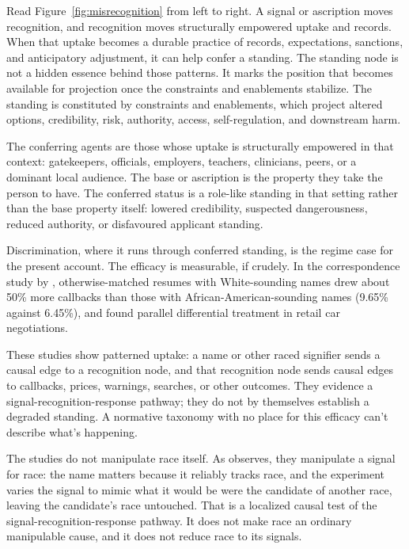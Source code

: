 \documentclass[12pt]{article}
\begin{document}
Read Figure~\ref{fig:misrecognition} from left to right. A signal or ascription moves recognition, and recognition moves structurally empowered uptake and records. When that uptake becomes a durable practice of records, expectations, sanctions, and anticipatory adjustment, it can help confer a standing. The standing node is not a hidden essence behind those patterns. It marks the position that becomes available for projection once the constraints and enablements stabilize. The standing is constituted by constraints and enablements, which project altered options, credibility, risk, authority, access, self-regulation, and downstream harm.

The conferring agents are those whose uptake is structurally empowered in that context: gatekeepers, officials, employers, teachers, clinicians, peers, or a dominant local audience. The base or ascription is the property they take the person to have. The conferred status is a role-like standing in that setting rather than the base property itself: lowered credibility, suspected dangerousness, reduced authority, or disfavoured applicant standing.

Discrimination, where it runs through conferred standing, is the regime case for the present account. The efficacy is measurable, if crudely. In the correspondence study by \textcite[997--998]{bertrandMullainathan2004EmilyGreg}, otherwise-matched resumes with White-sounding names drew about 50\% more callbacks than those with African-American-sounding names (9.65\% against 6.45\%), and \textcite{ayres1991FairDriving} found parallel differential treatment in retail car negotiations.

These studies show patterned uptake: a name or other raced signifier sends a causal edge to a recognition node, and that recognition node sends causal edges to callbacks, prices, warnings, searches, or other outcomes. They evidence a signal-recognition-response pathway; they do not by themselves establish a degraded standing. A normative taxonomy with no place for this efficacy can't describe what's happening.

The studies do not manipulate race itself. As \textcite{weinbergerSignalManipulation} observes, they manipulate a signal for race: the name matters because it reliably tracks race, and the experiment varies the signal to mimic what it would be were the candidate of another race, leaving the candidate's race untouched. That is a localized causal test of the signal-recognition-response pathway. It does not make race an ordinary manipulable cause, and it does not reduce race to its signals.
\end{document}
